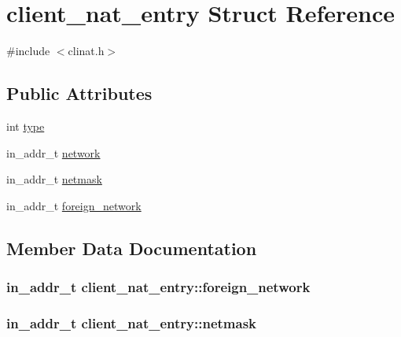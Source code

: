 \hypertarget{structclient__nat__entry}{}\section{client\+\_\+nat\+\_\+entry Struct Reference}
\label{structclient__nat__entry}


{\ttfamily \#include $<$clinat.\+h$>$}

\subsection*{Public Attributes}
\begin{DoxyCompactItemize}
\item 
int \hyperlink{structclient__nat__entry_a1ef20d15d70fa68864a1fb9714616cd9}{type}
\item 
in\+\_\+addr\+\_\+t \hyperlink{structclient__nat__entry_a4201fa6551314373401d386494ca451d}{network}
\item 
in\+\_\+addr\+\_\+t \hyperlink{structclient__nat__entry_ad9ea7e6de4bd6099bfaf6a5a8b131191}{netmask}
\item 
in\+\_\+addr\+\_\+t \hyperlink{structclient__nat__entry_ad2a5c775232e4c39b1582c87fe157ea2}{foreign\+\_\+network}
\end{DoxyCompactItemize}


\subsection{Member Data Documentation}
\hypertarget{structclient__nat__entry_ad2a5c775232e4c39b1582c87fe157ea2}{}
\subsubsection[{foreign\+\_\+network}]{\setlength{\rightskip}{0pt plus 5cm}in\+\_\+addr\+\_\+t client\+\_\+nat\+\_\+entry\+::foreign\+\_\+network}\label{structclient__nat__entry_ad2a5c775232e4c39b1582c87fe157ea2}
\hypertarget{structclient__nat__entry_ad9ea7e6de4bd6099bfaf6a5a8b131191}{}
\subsubsection[{netmask}]{\setlength{\rightskip}{0pt plus 5cm}in\+\_\+addr\+\_\+t client\+\_\+nat\+\_\+entry\+::netmask}\label{structclient__nat__entry_ad9ea7e6de4bd6099bfaf6a5a8b131191}
\hypertarget{structclient__nat__entry_a4201fa6551314373401d386494ca451d}{}

